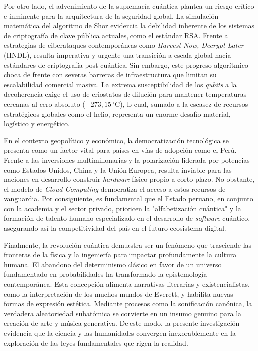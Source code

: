 \documentclass[12pt,a4paper]{article}
\begin{document}
\vspace{0.4cm}
Por otro lado, el advenimiento de la supremacía cuántica plantea un riesgo crítico e inminente para la arquitectura de la seguridad global. La simulación matemática del algoritmo de Shor evidencia la debilidad inherente de los sistemas de criptografía de clave pública actuales, como el estándar RSA. Frente a estrategias de ciberataques contemporáneas como \textit{Harvest Now, Decrypt Later} (HNDL), resulta imperativa y urgente una transición a escala global hacia estándares de criptografía post-cuántica. Sin embargo, este progreso algorítmico choca de frente con severas barreras de infraestructura que limitan su escalabilidad comercial masiva. La extrema susceptibilidad de los \textit{qubits} a la decoherencia exige el uso de criostatos de dilución para mantener temperaturas cercanas al cero absoluto ($-273,15\,^{\circ}\mathrm{C}$), lo cual, sumado a la escasez de recursos estratégicos globales como el helio, representa un enorme desafío material, logístico y energético.

\vspace{0.4cm}
En el contexto geopolítico y económico, la democratización tecnológica se presenta como un factor vital para países en vías de adopción como el Perú. Frente a las inversiones multimillonarias y la polarización liderada por potencias como Estados Unidos, China y la Unión Europea, resulta inviable para las naciones en desarrollo construir \textit{hardware} físico propio a corto plazo. No obstante, el modelo de \textit{Cloud Computing} democratiza el acceso a estos recursos de vanguardia. Por consiguiente, es fundamental que el Estado peruano, en conjunto con la academia y el sector privado, prioricen la "alfabetización cuántica" y la formación de talento humano especializado en el desarrollo de \textit{software} cuántico, asegurando así la competitividad del país en el futuro ecosistema digital.

\vspace{0.4cm}
Finalmente, la revolución cuántica demuestra ser un fenómeno que trasciende las fronteras de la física y la ingeniería para impactar profundamente la cultura humana. El abandono del determinismo clásico en favor de un universo fundamentado en probabilidades ha transformado la epistemología contemporánea. Esta concepción alimenta narrativas literarias y existencialistas, como la interpretación de los muchos mundos de Everett, y habilita nuevas formas de expresión estética. Mediante procesos como la sonificación canónica, la verdadera aleatoriedad subatómica se convierte en un insumo genuino para la creación de arte y música generativa. De este modo, la presente investigación evidencia que la ciencia y las humanidades convergen inexorablemente en la exploración de las leyes fundamentales que rigen la realidad.
\end{document}
